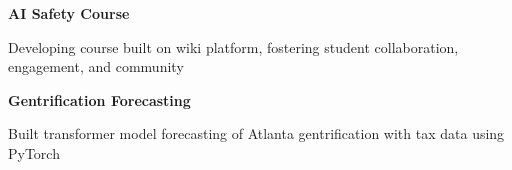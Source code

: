 \documentclass[10pt]{article}
\newcommand{\resumeSubHeading}[4]{
    \vspace*{5pt}
    \textbf{#1} — \textbf{#2} \textsl{(#3) \hfill #4}
}
\newcommand{\resumeListHeading}[1]{\vspace*{5pt}\textbf{#1}}
\newcommand{\resumeProject}[2]{
    \resumeListHeading{#1}
    \begin{itemize*}[label=$|$]
        \item #2
    \end{itemize*}
}
\begin{document}





\resumeProject{AI Safety Course}{
    Developing course built on wiki platform, fostering student collaboration, engagement, and community
}

\resumeProject{Gentrification Forecasting}{
    Built transformer model forecasting of Atlanta gentrification with tax data using PyTorch
}
\end{document}
